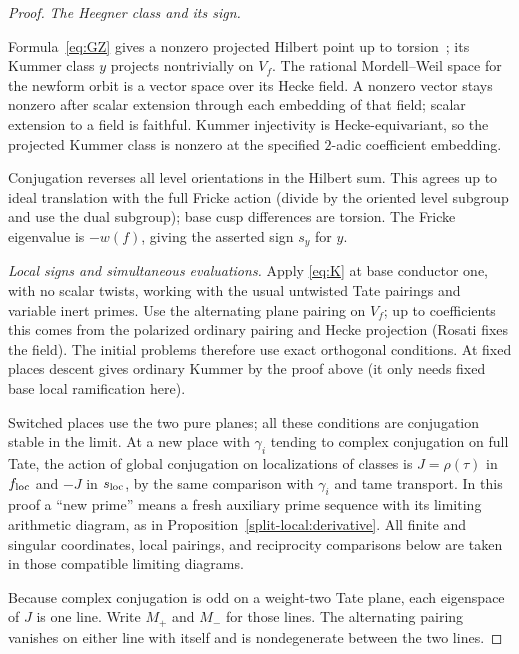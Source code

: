 \begin{proof}
\smallskip\noindent\emph{The Heegner class and its sign.}

Formula~\eqref{eq:GZ} gives a nonzero projected Hilbert point up to torsion~\cite{GZ86,CST14}; its Kummer class \(y\) projects nontrivially on \(V_f\). The rational Mordell--Weil space for the newform orbit is a vector space over its Hecke field. A nonzero vector stays nonzero after scalar extension through each embedding of that field; scalar extension to a field is faithful. Kummer injectivity is Hecke-equivariant, so the projected Kummer class is nonzero at the specified \(2\)-adic coefficient embedding.

Conjugation reverses all level orientations in the Hilbert sum. This agrees up to ideal translation with the full Fricke action (divide by the oriented level subgroup and use the dual subgroup); base cusp differences are torsion. The Fricke eigenvalue is \(-w(f)\), giving the asserted sign \(s_y\) for \(y\). 

\smallskip\noindent\emph{Local signs and simultaneous evaluations.}
Apply \eqref{eq:K} at base conductor one, with no scalar twists, working with the usual untwisted Tate pairings and variable inert primes. Use the alternating plane pairing on \(V_f\); up to coefficients this comes from the polarized ordinary pairing and Hecke projection (Rosati fixes the field). The initial problems therefore use exact orthogonal conditions. At fixed places descent gives ordinary Kummer by the proof above (it only needs fixed base local ramification here).

Switched places use the two pure planes; all these conditions are conjugation stable in the limit. At a new place with \(\gamma_i\) tending to complex conjugation on full Tate, the action of global conjugation on localizations of classes is \(J=\rho(\tau)\) in \(f_{\rm loc}\) and \(-J\) in \(s_{\rm loc}\), by the same comparison with \(\gamma_i\) and tame transport. In this proof a ``new prime'' means a fresh auxiliary prime sequence with its limiting arithmetic diagram, as in Proposition~\ref{split-local:derivative}. All finite and singular coordinates, local pairings, and reciprocity comparisons below are taken in those compatible limiting diagrams.

Because complex conjugation is odd on a weight-two Tate plane, each eigenspace of \(J\) is one line. Write \(M_+\) and \(M_-\) for those lines. The alternating pairing vanishes on either line with itself and is nondegenerate between the two lines.


\end{proof}
